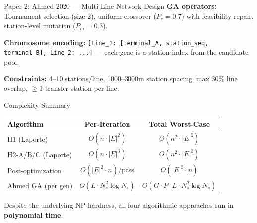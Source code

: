 \documentclass[final]{beamer}
\begin{document}
\begin{frame}[t]
\begin{minipage}[t]{0.48\paperwidth}
\begin{block}{\Large Paper 2: Ahmed 2020 --- Multi-Line Network Design}
\textbf{GA operators:} Tournament selection (size 2), uniform crossover ($P_c = 0.7$) with feasibility repair, station-level mutation ($P_m = 0.3$).

\textbf{Chromosome encoding:} \texttt{[Line\_1: [terminal\_A, station\_seq, terminal\_B], Line\_2: ...]} --- each gene is a station index from the candidate pool.

\textbf{Constraints:} 4--10 stations/line, 1000--3000m station spacing, max 30\% line overlap, $\geq$1 transfer station per line.
\end{block}

\vspace{0.15cm}

\begin{block}{\Large Complexity Summary}
\normalsize
\begin{center}
\small
\begin{tabular}{@{}lcc@{}}
\toprule
\textbf{Algorithm} & \textbf{Per-Iteration} & \textbf{Total Worst-Case} \\
\midrule
H1 (Laporte) & $O(n \cdot |E|^2)$ & $O(n^2 \cdot |E|^2)$ \\
H2-A/B/C (Laporte) & $O(n \cdot |E|^3)$ & $O(n^2 \cdot |E|^3)$ \\
Post-optimization & $O(|E|^2 \cdot n)$/pass & $O(|E|^3 \cdot n)$ \\
Ahmed GA (per gen) & $O(L \cdot N_s^2 \log N_s)$ & $O(G \cdot P \cdot L \cdot N_s^2 \log N_s)$ \\
\bottomrule
\end{tabular}
\end{center}
Despite the underlying NP-hardness, all four algorithmic approaches run in \textbf{polynomial time}.
\end{block}

\vspace{0.15cm}


\end{minipage}
\end{frame}
\end{document}
